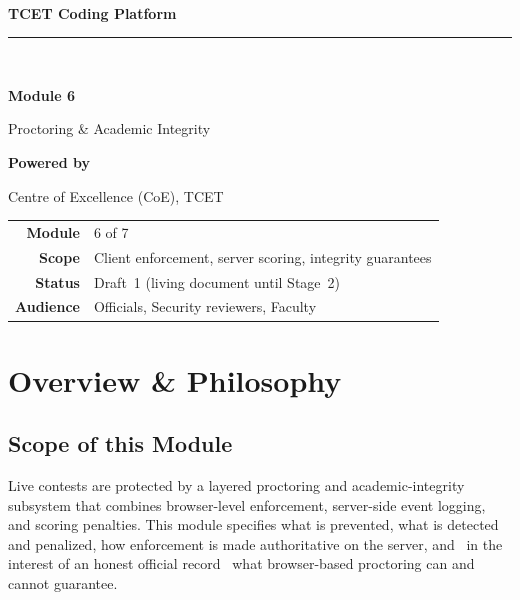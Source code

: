 \documentclass[12pt,a4paper,oneside]{report}
\begin{document}
\begin{titlepage}\centering
\vspace*{1.4cm}{\color{tcetaccent}\rule{\linewidth}{1.2pt}}\\[0.5cm]
{\LARGE\bfseries TCET Coding Platform\par}
{\color{tcetaccent}\rule{\linewidth}{1.2pt}}\\[1.4cm]
{\Huge\bfseries\color{tcetblue} Module 6\par}\vspace{0.3cm}
{\Huge Proctoring \& Academic Integrity\par}\vspace{2.2cm}
{\large\bfseries Powered by\par}{\Large\color{tcetblue} Centre of Excellence (CoE), TCET\par}\vfill
\begin{tabular}{rl}\textbf{Module} & 6 of 7\\[3pt]
\textbf{Scope} & Client enforcement, server scoring, integrity guarantees\\[3pt]
\textbf{Status} & Draft~1 (living document until Stage~2)\\[3pt]
\textbf{Audience} & Officials, Security reviewers, Faculty\\\end{tabular}
\vspace{0.8cm}{\small\itshape \today\par}\end{titlepage}
\tableofcontents\clearpage{}

\chapter{Overview \& Philosophy}
\section{Scope of this Module}
Live contests are protected by a layered proctoring and academic-integrity
subsystem that combines browser-level enforcement, server-side event logging, and
scoring penalties. This module specifies what is prevented, what is detected and
penalized, how enforcement is made authoritative on the server, and \textemdash\
in the interest of an honest official record \textemdash\ what browser-based
proctoring can and cannot guarantee.
\end{document}
